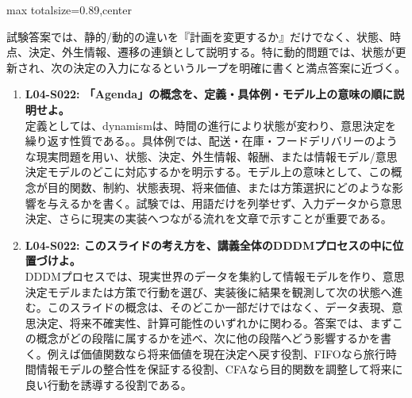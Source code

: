 \begin{minipage}[t]{0.58\textwidth}
\begin{adjustbox}{max totalsize={\textwidth}{0.89\textheight},center}
\begin{minipage}{\textwidth}
試験答案では、静的/動的の違いを『計画を変更するか』だけでなく、状態、時点、決定、外生情報、遷移の連鎖として説明する。特に動的問題では、状態が更新され、次の決定の入力になるというループを明確に書くと満点答案に近づく。\par{}\begin{enumerate}\item \textbf{L04-S022: 「Agenda」の概念を、定義・具体例・モデル上の意味の順に説明せよ。}\\定義としては、dynamismは、時間の進行により状態が変わり、意思決定を繰り返す性質である。。具体例では、配送・在庫・フードデリバリーのような現実問題を用い、状態、決定、外生情報、報酬、または情報モデル/意思決定モデルのどこに対応するかを明示する。モデル上の意味として、この概念が目的関数、制約、状態表現、将来価値、または方策選択にどのような影響を与えるかを書く。試験では、用語だけを列挙せず、入力データから意思決定、さらに現実の実装へつながる流れを文章で示すことが重要である。\item \textbf{L04-S022: このスライドの考え方を、講義全体のDDDMプロセスの中に位置づけよ。}\\DDDMプロセスでは、現実世界のデータを集約して情報モデルを作り、意思決定モデルまたは方策で行動を選び、実装後に結果を観測して次の状態へ進む。このスライドの概念は、そのどこか一部だけではなく、データ表現、意思決定、将来不確実性、計算可能性のいずれかに関わる。答案では、まずこの概念がどの段階に属するかを述べ、次に他の段階へどう影響するかを書く。例えば価値関数なら将来価値を現在決定へ戻す役割、FIFOなら旅行時間情報モデルの整合性を保証する役割、CFAなら目的関数を調整して将来に良い行動を誘導する役割である。\end{enumerate}
\end{minipage}
\end{adjustbox}
\end{minipage}


